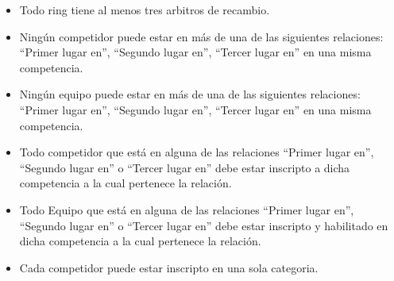 \begin{itemize}
\item Todo ring tiene al menos tres arbitros de recambio.
\item Ningún competidor puede estar en más de una de las siguientes relaciones: ``Primer lugar en'', ``Segundo lugar en'', ``Tercer lugar en'' en una misma competencia.
\item Ningún equipo puede estar en más de una de las siguientes relaciones: ``Primer lugar en'', ``Segundo lugar en'', ``Tercer lugar en'' en una misma competencia.
\item Todo competidor que está en alguna de las relaciones ``Primer lugar en'', ``Segundo lugar en'' o ``Tercer lugar en'' debe estar inscripto a dicha competencia a la cual pertenece la relación.
\item Todo Equipo que está en alguna de las relaciones ``Primer lugar en'', ``Segundo lugar en'' o ``Tercer lugar en'' debe estar inscripto y habilitado en dicha competencia a la cual pertenece la relación.
\item Cada competidor puede estar inscripto en una sola categoria.
\end{itemize}

